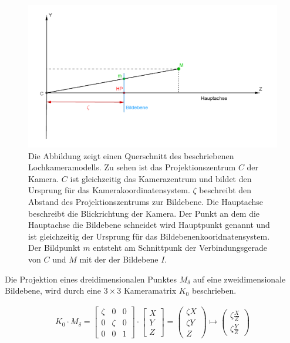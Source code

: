 \begin{figure}[!htb]
	\centering
	\includegraphics[width=.8\linewidth]{images/PinholeCameraModell2D.png}
	\caption[Lochkameramodell Querschnitt]{Die Abbildung zeigt einen Querschnitt des beschriebenen Lochkameramodells. Zu sehen ist das Projektionszentrum $C$ der Kamera. $C$ ist gleichzeitig das Kamerazentrum und bildet den Ursprung für das Kamerakoordinatensystem. $\zeta$ beschreibt den Abstand des Projektionszentrums zur Bildebene. Die Hauptachse beschreibt die Blickrichtung der Kamera. Der Punkt an dem die Hauptachse die Bildebene schneidet wird Hauptpunkt genannt und ist gleichzeitig der Ursprung für das Bildebenenkooridnatensystem. Der Bildpunkt $m$ entsteht am Schnittpunk der Verbindungsgerade von $C$ und $M$ mit der der Bildebene $I$.}
	\label{fig:PinholeCamera2D}
\end{figure}

Die Projektion eines dreidimensionalen Punktes $M_\delta$ auf eine zweidimensionale Bildebene, wird durch eine $3 \times 3$ Kameramatrix $K_0$ beschrieben. 

\begin{gather}
	K_0\cdot M_\delta =
	\begin{bmatrix}
		\zeta&0&0\\
		0&\zeta&0\\
		0&0&1
	\end{bmatrix}
	\cdot
	\begin{bmatrix}
		X\\Y\\Z
	\end{bmatrix}
	=
	\begin{pmatrix}
		\zeta X\\ \zeta Y\\ Z
	\end{pmatrix}
	\mapsto
	\begin{pmatrix}
		\zeta \frac{X}{Z}\\ \zeta \frac{Y}{Z}
	\end{pmatrix}
	\label{eq:2.1}
\end{gather}\\

